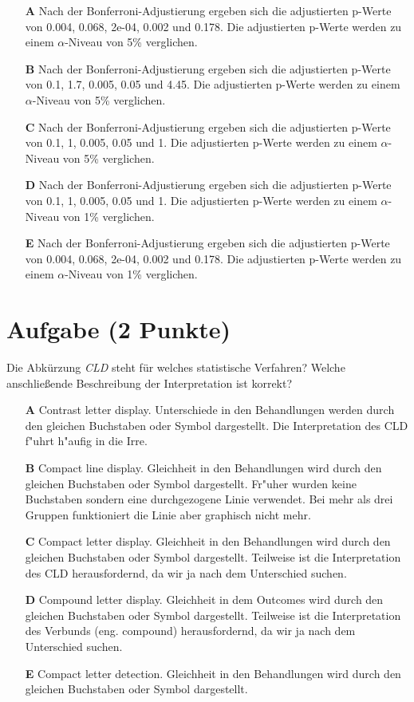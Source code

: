 \documentclass[a4paper, 9pt]{scrartcl}\usepackage[]{graphicx}\usepackage[]{xcolor}
\begin{document}
\begin{enumerate}
\item [\textbf{A} \msquare] Nach der Bonferroni-Adjustierung ergeben sich die adjustierten p-Werte von 0.004, 0.068, 2e-04, 0.002 und 0.178. Die adjustierten p-Werte werden zu einem $\alpha$-Niveau von 5\% verglichen.
\item [\textbf{B} \msquare] Nach der Bonferroni-Adjustierung ergeben sich die adjustierten p-Werte von 0.1, 1.7, 0.005, 0.05 und 4.45. Die adjustierten p-Werte werden zu einem $\alpha$-Niveau von 5\% verglichen.
\item [\textbf{C} \msquare] Nach der Bonferroni-Adjustierung ergeben sich die adjustierten p-Werte von 0.1, 1, 0.005, 0.05 und 1. Die adjustierten p-Werte werden zu einem $\alpha$-Niveau von 5\% verglichen.
\item [\textbf{D} \msquare] Nach der Bonferroni-Adjustierung ergeben sich die adjustierten p-Werte von 0.1, 1, 0.005, 0.05 und 1. Die adjustierten p-Werte werden zu einem $\alpha$-Niveau von 1\% verglichen.
\item [\textbf{E} \msquare] Nach der Bonferroni-Adjustierung ergeben sich die adjustierten p-Werte von 0.004, 0.068, 2e-04, 0.002 und 0.178. Die adjustierten p-Werte werden zu einem $\alpha$-Niveau von 1\% verglichen.
\end{enumerate}

\section{Aufgabe \hfill (2 Punkte)}

Die Abk{\"u}rzung \textit{CLD} steht f{\"u}r welches statistische Verfahren? Welche
anschlie{\ss}ende Beschreibung der Interpretation ist korrekt? 



\begin{enumerate}
\item [\textbf{A} \msquare] Contrast letter display. Unterschiede in den Behandlungen werden durch den gleichen Buchstaben oder Symbol dargestellt. Die Interpretation des CLD f{"u}hrt h{"a}ufig in die Irre.
\item [\textbf{B} \msquare] Compact line display. Gleichheit in den Behandlungen wird durch den gleichen Buchstaben oder Symbol dargestellt. Fr{"u}her wurden keine Buchstaben sondern eine durchgezogene Linie verwendet. Bei mehr als drei Gruppen funktioniert die Linie aber graphisch nicht mehr.
\item [\textbf{C} \msquare] Compact letter display. Gleichheit in den Behandlungen wird durch den gleichen Buchstaben oder Symbol dargestellt. Teilweise ist die Interpretation des CLD herausfordernd, da wir ja nach dem Unterschied suchen.
\item [\textbf{D} \msquare] Compound letter display. Gleichheit in dem Outcomes wird durch den gleichen Buchstaben oder Symbol dargestellt. Teilweise ist die Interpretation des Verbunds (eng. compound) herausfordernd, da wir ja nach dem Unterschied suchen.
\item [\textbf{E} \msquare] Compact letter detection. Gleichheit in den Behandlungen wird durch den gleichen Buchstaben oder Symbol dargestellt.
\end{enumerate}
\end{document}
